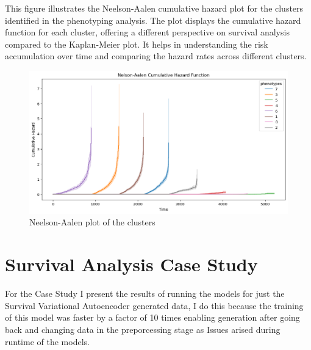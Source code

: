 \noindent This figure illustrates the Neelson-Aalen cumulative hazard plot for the clusters identified in the phenotyping analysis. The plot displays the cumulative hazard function for each cluster, offering a different perspective on survival analysis compared to the Kaplan-Meier plot. It helps in understanding the risk accumulation over time and comparing the hazard rates across different clusters.
\begin{figure}[h]
    \centering
    \includegraphics[scale=0.40]{Figures/EDA/cluster_neelson.png}
    \caption{Neelson-Aalen plot of the clusters}
    \label{fig:your_label}
\end{figure}


\section{Survival Analysis Case Study}
For the Case Study I present the results of running the models for just the Survival Variational Autoencoder generated data, I do this because the training of this model was faster by a factor of 10 times enabling generation after going back and changing data in the preporcessing stage as Issues arised during runtime of the models.

